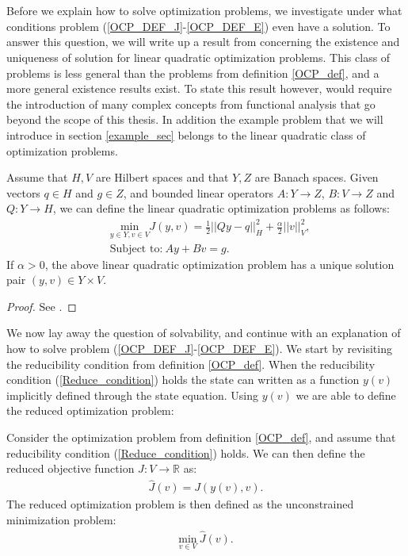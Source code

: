 \\
\\
Before we explain how to solve optimization problems, we investigate under what conditions problem (\ref{OCP_DEF_J}-\ref{OCP_DEF_E}) even have a solution. To answer this question, we will write up a result from \cite{hinze2008optimization} concerning the existence and uniqueness of solution for linear quadratic optimization problems. This class of problems is less general than the problems from definition \ref{OCP_def}, and a more general existence results exist. To state this result however, would require the introduction of many complex concepts from functional analysis that go beyond the scope of this thesis. In addition the example problem that we will introduce in section \ref{example_sec} belongs to the linear quadratic class of optimization problems. 
\begin{theorem} \label{existence}
Assume that $H,V$ are Hilbert spaces and that $Y,Z$ are Banach spaces. Given vectors $q\in H$ and $g\in Z$, and bounded linear operators $A:Y\rightarrow Z$, $B:V\rightarrow Z$ and $Q:Y\rightarrow H$, we can define the linear quadratic optimization problems as follows:
\begin{align*}
&\underset{y\in Y,v\in V}{\text{min}}J(y,v) = \frac{1}{2}||Qy-q||_H^2 + \frac{\alpha}{2}||v||_V^2, \\
&\textrm{Subject to:} \ Ay + Bv = g.
\end{align*}
If $\alpha>0$, the above linear quadratic optimization problem has a unique solution pair $(y,v)\in Y\times V$.
\end{theorem}   
\begin{proof}
See \cite{hinze2008optimization}.
\end{proof}
\noindent
We now lay away the question of solvability, and continue with an explanation of how to solve problem (\ref{OCP_DEF_J}-\ref{OCP_DEF_E}). We start by revisiting the reducibility condition from definition \ref{OCP_def}. When the reducibility condition (\ref{Reduce_condition}) holds the state can written as a function $y(v)$ implicitly defined through the state equation. Using $y(v)$ we are able to define the reduced optimization problem:
\begin{definition} \label{DEF_RED_OCP}
Consider the optimization problem from definition \ref{OCP_def}, and assume that reducibility condition (\ref{Reduce_condition}) holds. We can then define the reduced objective function $\hat J:V\rightarrow\mathbb{R}$ as:
\begin{align}
\hat J(v) = J(y(v),v). \label{ROF}
\end{align}
The reduced optimization problem is then defined as the unconstrained minimization problem:
\begin{align}
\underset{v\in V}{\text{min}} \ \hat J(v). \label{reduced problem}
\end{align}
\end{definition} 
